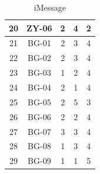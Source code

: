 \documentclass[acmsmall,screen,authorversion,nonacm]{acmart}
\begin{document}
\begin{center}
\begin{table}[H]
\begin{tabular}{|c|c|c|c|c|}
    20    & ZY-06      & 2  & 4  & 2  \\ \hline
    21    & BG-01      & 2  & 3  & 4  \\ \hline
    22    & BG-02      & 2  & 3  & 4  \\ \hline
    23    & BG-03      & 1  & 2  & 4  \\ \hline
    24    & BG-04      & 2  & 1  & 4  \\ \hline
    25    & BG-05      & 2  & 5  & 3  \\ \hline
    26    & BG-06      & 2  & 2  & 4  \\ \hline
    27    & BG-07      & 3  & 3  & 4  \\ \hline
    28    & BG-08      & 1  & 3  & 4  \\ \hline
    29    & BG-09      & 1  & 1  & 5  \\ \hline
    \end{tabular}
    \caption{iMessage}
    \end{table}
\end{center}
\end{document}
